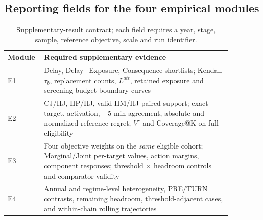 \documentclass[10pt,a4paper]{article}
\numberwithin{equation}{section}
\begin{document}
\subsection{Reporting fields for the four empirical modules}
\begin{table}[htbp]\centering\footnotesize
\caption{Supplementary-result contract; each field requires a year, stage, sample, reference objective, scale and run identifier.}
\label{tab:sup_result_contract}
\begin{tabular}{p{0.10\linewidth}p{0.77\linewidth}}\toprule
Module & Required supplementary evidence \\\midrule
E1 & Delay, Delay+Exposure, Consequence shortlists; Kendall $\tau_b$, replacement counts, $L^{att}$, retained exposure and screening-budget boundary curves \\
E2 & CJ/HJ, HP/HJ, valid HM/HJ paired support; exact target, activation, $\pm5$-min agreement, absolute and normalized reference regret; $V^r$ and Coverage@K on full eligibility \\
E3 & Four objective weights on the \emph{same} eligible cohort; Marginal/Joint per-target values, action margins, component responses; threshold $\times$ headroom controls and comparator validity \\
E4 & Annual and regime-level heterogeneity, PRE/TURN contrasts, remaining headroom, threshold-adjacent cases, and within-chain rolling trajectories \\\bottomrule\end{tabular}\end{table}
\end{document}
